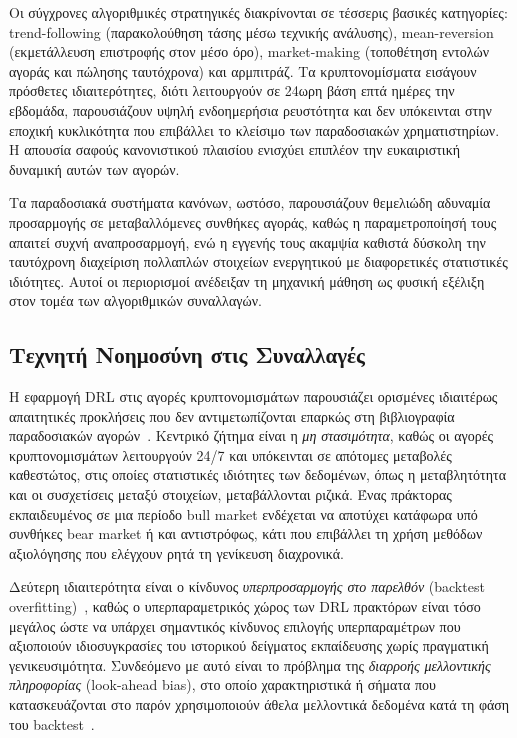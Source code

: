 Οι σύγχρονες αλγοριθμικές στρατηγικές διακρίνονται σε τέσσερις βασικές κατηγορίες:
trend-following (παρακολούθηση τάσης μέσω τεχνικής ανάλυσης), mean-reversion
(εκμετάλλευση επιστροφής στον μέσο όρο), market-making (τοποθέτηση εντολών αγοράς
και πώλησης ταυτόχρονα) και αρμπιτράζ. Τα κρυπτονομίσματα εισάγουν πρόσθετες
ιδιαιτερότητες, διότι λειτουργούν σε 24ωρη βάση επτά ημέρες την εβδομάδα, παρουσιάζουν
υψηλή ενδοημερήσια ρευστότητα και δεν υπόκεινται στην εποχική κυκλικότητα που
επιβάλλει το κλείσιμο των παραδοσιακών χρηματιστηρίων. Η απουσία σαφούς
κανονιστικού πλαισίου ενισχύει επιπλέον την ευκαιριστική δυναμική αυτών των αγορών.

Τα παραδοσιακά συστήματα κανόνων, ωστόσο, παρουσιάζουν θεμελιώδη αδυναμία
προσαρμογής σε μεταβαλλόμενες συνθήκες αγοράς, καθώς η
παραμετροποίησή τους απαιτεί συχνή αναπροσαρμογή, ενώ η εγγενής τους ακαμψία
καθιστά δύσκολη την ταυτόχρονη διαχείριση πολλαπλών στοιχείων ενεργητικού με
διαφορετικές στατιστικές ιδιότητες. Αυτοί οι περιορισμοί ανέδειξαν τη μηχανική
μάθηση ως φυσική εξέλιξη στον τομέα των αλγοριθμικών συναλλαγών.


\subsection{Τεχνητή Νοημοσύνη στις Συναλλαγές}
\label{subsec:ai-trading}

Η εφαρμογή DRL στις αγορές κρυπτονομισμάτων παρουσιάζει ορισμένες ιδιαιτέρως
απαιτητικές προκλήσεις που δεν αντιμετωπίζονται επαρκώς στη βιβλιογραφία
παραδοσιακών αγορών~\cite{moody2001rltrading,deng2016drltrading}. Κεντρικό
ζήτημα είναι η \emph{μη στασιμότητα}, καθώς οι αγορές κρυπτονομισμάτων λειτουργούν
24/7 και υπόκεινται σε απότομες μεταβολές καθεστώτος, στις
οποίες στατιστικές ιδιότητες των δεδομένων, όπως η μεταβλητότητα και οι
συσχετίσεις μεταξύ στοιχείων, μεταβάλλονται ριζικά. Ένας πράκτορας εκπαιδευμένος
σε μια περίοδο bull market ενδέχεται να αποτύχει κατάφωρα υπό συνθήκες bear market
ή και αντιστρόφως, κάτι που επιβάλλει τη χρήση μεθόδων αξιολόγησης που
ελέγχουν ρητά τη γενίκευση διαχρονικά.

Δεύτερη ιδιαιτερότητα είναι ο κίνδυνος \emph{υπερπροσαρμογής στο παρελθόν}
(backtest overfitting)~\cite{lopezdeprado2018}, καθώς ο υπερπαραμετρικός χώρος των DRL
πρακτόρων είναι τόσο μεγάλος ώστε να υπάρχει σημαντικός κίνδυνος επιλογής
υπερπαραμέτρων που αξιοποιούν ιδιοσυγκρασίες του ιστορικού δείγματος εκπαίδευσης
χωρίς πραγματική γενικευσιμότητα. Συνδεόμενο με αυτό είναι το πρόβλημα της
\emph{διαρροής μελλοντικής πληροφορίας} (look-ahead bias), στο οποίο
χαρακτηριστικά ή σήματα που κατασκευάζονται στο παρόν χρησιμοποιούν άθελα
μελλοντικά δεδομένα κατά τη φάση του backtest~\cite{lopezdeprado2018}.

